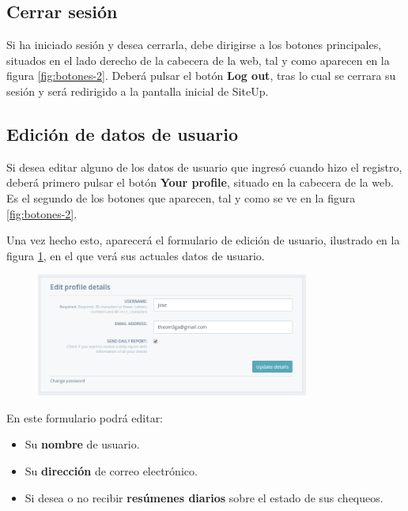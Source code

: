 \subsection{Cerrar sesión}

Si ha iniciado sesión y desea cerrarla, debe dirigirse a los botones
principales, situados en el lado derecho de la cabecera de la web, tal y como
aparecen en la figura \ref{fig:botones-2}. Deberá pulsar el botón \textbf{Log
  out}, tras lo cual se cerrara su sesión y será redirigido a la pantalla
inicial de SiteUp.

\subsection{Edición de datos de usuario}

Si desea editar alguno de los datos de usuario que ingresó cuando hizo el
registro, deberá primero pulsar el botón \textbf{Your profile}, situado en la
cabecera de la web. Es el segundo de los botones que aparecen, tal y como se ve
en la figura \ref{fig:botones-2}.

Una vez hecho esto, aparecerá el formulario de edición de usuario, ilustrado en
la figura \ref{fig:formulario-usuario}, en el que verá sus actuales datos de
usuario. 

\begin{figure}[hbtp]
  \centering
  \includegraphics[width=0.8\textwidth]{apendice_manual_usuario/pantalla_perfil_usuario.png}
  \caption{}
  \label{fig:formulario-usuario}
\end{figure}

En este formulario podrá editar:

\begin{itemize}
\item Su \textbf{nombre} de usuario.
\item Su \textbf{dirección} de correo electrónico.
\item Si desea o no recibir \textbf{resúmenes diarios} sobre el estado de sus chequeos.
\end{itemize}

